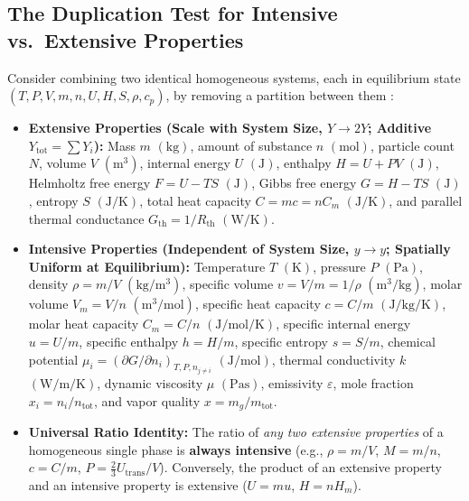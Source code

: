 \subsection{The Duplication Test for Intensive vs.\ Extensive Properties}
Consider combining two identical homogeneous systems, each in equilibrium state $(T, P, V, m, n, U, H, S, \rho, c_p)$, by removing a partition between them :
\begin{itemize}
  \item \textbf{Extensive Properties (Scale with System Size, $Y \to 2Y$; Additive $Y_{\mathrm{tot}} = \sum Y_i$):} Mass $m$ $(\si{\kilogram})$, amount of substance $n$ $(\si{\mole})$, particle count $N$, volume $V$ $(\si{\cubic\meter})$, internal energy $U$ $(\si{\joule})$, enthalpy $H = U + PV$ $(\si{\joule})$, Helmholtz free energy $F = U - TS$ $(\si{\joule})$, Gibbs free energy $G = H - TS$ $(\si{\joule})$, entropy $S$ $(\si{\joule\per\kelvin})$, total heat capacity $C = mc = nC_m$ $(\si{\joule\per\kelvin})$, and parallel thermal conductance $G_{\mathrm{th}} = 1/R_{\mathrm{th}}$ $(\si{\watt\per\kelvin})$.
  \item \textbf{Intensive Properties (Independent of System Size, $y \to y$; Spatially Uniform at Equilibrium):} Temperature $T$ $(\si{\kelvin})$, pressure $P$ $(\si{\pascal})$, density $\rho = m/V$ $(\si{\kilogram\per\cubic\meter})$, specific volume $v = V/m = 1/\rho$ $(\si{\cubic\meter\per\kilogram})$, molar volume $V_m = V/n$ $(\si{\cubic\meter\per\mole})$, specific heat capacity $c = C/m$ $(\si{\joule\per\kilogram\per\kelvin})$, molar heat capacity $C_m = C/n$ $(\si{\joule\per\mole\per\kelvin})$, specific internal energy $u = U/m$, specific enthalpy $h = H/m$, specific entropy $s = S/m$, chemical potential $\mu_i = (\partial G/\partial n_i)_{T,P,n_{j\neq i}}$ $(\si{\joule\per\mole})$, thermal conductivity $k$ $(\si{\watt\per\meter\per\kelvin})$, dynamic viscosity $\mu$ $(\si{\pascal\second})$, emissivity $\varepsilon$, mole fraction $x_i = n_i/n_{\mathrm{tot}}$, and vapor quality $x = m_g/m_{\mathrm{tot}}$.
  \item \textbf{Universal Ratio Identity:} The ratio of \emph{any two extensive properties} of a homogeneous single phase is \textbf{always intensive} (e.g., $\rho = m/V$, $M = m/n$, $c = C/m$, $P = \tfrac{2}{3}U_{\mathrm{trans}}/V$). Conversely, the product of an extensive property and an intensive property is extensive ($U = mu$, $H = nH_m$).
\end{itemize}

